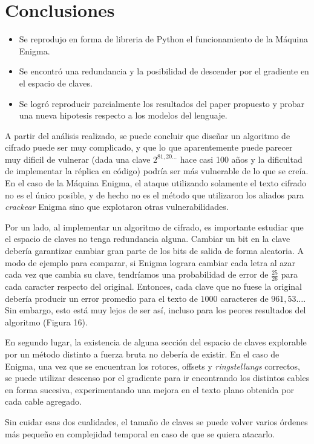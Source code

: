\documentclass[a4paper,10pt]{article}
\begin{document}
\section{Conclusiones}
\begin{itemize}
\item Se reprodujo en forma de libreria de Python el funcionamiento de la Máquina Enigma.
\item Se encontró una redundancia y la posibilidad de descender por el gradiente en el espacio de claves.
\item Se logró reproducir parcialmente los resultados del paper propuesto y probar una nueva hipotesis respecto a los modelos del lenguaje.
\end{itemize}

A partir del análisis realizado, se puede concluir que diseñar un algoritmo de cifrado puede ser muy complicado, y que lo que aparentemente puede parecer muy dificil de vulnerar (dada una clave $2^{81,20\ldots}$ hace casi 100 años y la dificultad de implementar la réplica en código) podría ser más vulnerable de lo que se creía. En el caso de la Máquina Enigma, el ataque utilizando solamente el texto cifrado no es el único posible, y de hecho no es el método que utilizaron los aliados para \textit{crackear} Enigma sino que explotaron otras vulnerabilidades.

Por un lado, al implementar un algoritmo de cifrado, es importante estudiar que el espacio de claves no tenga redundancia alguna. Cambiar un bit en la clave debería garantizar cambiar gran parte de los bits de salida de forma aleatoria. A modo de ejemplo para comparar, si Enigma lograra cambiar cada letra al azar cada vez que cambia su clave, tendríamos una probabilidad de error de $\frac{25}{26}$ para cada caracter respecto del original. Entonces, cada clave que no fuese la original debería producir un error promedio para el texto de $1000$ caracteres de $961,53\ldots$. Sin embargo, esto está muy lejos de ser así, incluso para los peores resultados del algoritmo (Figura 16).

En segundo lugar, la existencia de alguna sección del espacio de claves explorable por un método distinto a fuerza bruta no debería de existir. En el caso de Enigma, una vez que se encuentran los rotores, offsets y \textit{ringstellungs} correctos, se puede utilizar descenso por el gradiente para ir encontrando los distintos cables en forma sucesiva, experimentando una mejora en el texto plano obtenida por cada cable agregado.

Sin cuidar esas dos cualidades, el tamaño de claves se puede volver varios órdenes más pequeño en complejidad temporal en caso de que se quiera atacarlo.
\end{document}
